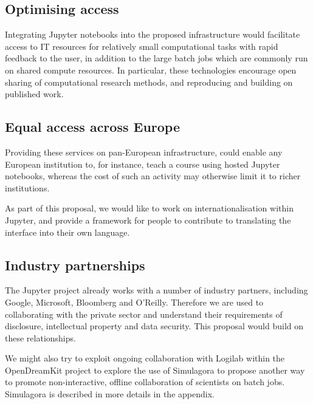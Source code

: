 
\subsection{Optimising access}

Integrating Jupyter notebooks into the proposed infrastructure would facilitate
access to IT resources for relatively small computational tasks with rapid
feedback to the user, in addition to the large batch jobs which are commonly
run on shared compute resources. In particular, these technologies encourage
open sharing of computational research methods, and reproducing and building on
published work.



\subsection{Equal access across Europe}

Providing these services on pan-European infrastructure, could enable any
European institution to, for instance, teach a course using hosted Jupyter
notebooks, whereas the cost of such an activity may otherwise limit it to richer
institutions.

As part of this proposal, we would like to work on internationalisation within
Jupyter, and provide a framework for people to contribute to translating the
interface into their own language.


\subsection{Industry partnerships}

The Jupyter project already works with a number of industry partners, including
Google, Microsoft, Bloomberg and O'Reilly. Therefore we are used to collaborating
with the private sector and understand their requirements of disclosure, intellectual
property and data security. This proposal would build on these relationships.

We might also try to exploit ongoing collaboration with Logilab within
the OpenDreamKit project to explore the use of Simulagora to propose
another way to promote non-interactive, offline collaboration of
scientists on batch jobs. Simulagora is described in more details in
the appendix.

